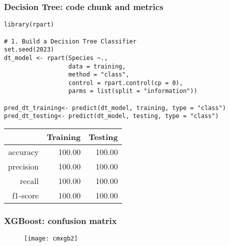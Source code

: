 \documentclass[border=5mm, convert, usenames, dvipsnames,beamer]{standalone}
\begin{document}
\begin{frame}[ fragile]{}
\frametitle{Decision Tree: code chunk and metrics}

\vspace{40}
\noindent


\begin{lstlisting}[style=R]
library(rpart)

# 1. Build a Decision Tree Classifier
set.seed(2023)
dt_model <- rpart(Species ~.,
                  data = training,
                  method = "class",
                  control = rpart.control(cp = 0),
                  parms = list(split = "information"))

pred_dt_training<- predict(dt_model, training, type = "class")
pred_dt_testing<- predict(dt_model, testing, type = "class")
\end{lstlisting}


\begin{table}[ht]
\centering
\begin{tabular}{rrr}
  \hline
 & Training & Testing \\ 
  \hline
accuracy & 100.00 & 100.00 \\ 
  precision & 100.00 & 100.00 \\ 
  recall & 100.00 & 100.00 \\ 
  f1-score & 100.00 & 100.00 \\ 
   \hline
\end{tabular}
\end{table}



\end{frame}


\begin{frame}[ fragile]{}
\frametitle{XGBoost: confusion matrix}

\vspace{40}
\noindent

\vspace{-5mm}
\begin{figure}[h!]
\begin{center}
\texttt{[image: cmxgb2]}
\end{center}
\end{figure}




\end{frame}
\end{document}
